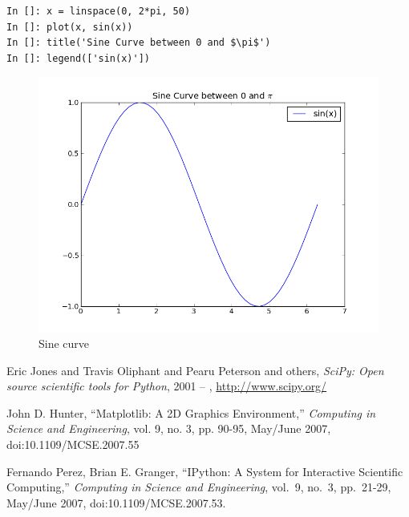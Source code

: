 \documentclass{article}
\begin{document}
\begin{lstlisting}
In []: x = linspace(0, 2*pi, 50)
In []: plot(x, sin(x))
In []: title('Sine Curve between 0 and $\pi$')
In []: legend(['sin(x)'])
\end{lstlisting}

\begin{figure}[h!]
  \begin{center}
    \includegraphics[scale=0.4]{sine}    
  \end{center}
  \caption{Sine curve}
  \label{fig:sin}
\end{figure}



\begin{thebibliography}{9}
    Eric Jones and Travis Oliphant and Pearu Peterson and others,
    \emph{SciPy: Open source scientific tools for Python}, 2001 -- , 
    \url{http://www.scipy.org/} 

   John D. Hunter, ``Matplotlib: A 2D Graphics Environment,''
   \emph{Computing in Science and Engineering}, vol. 9, no. 3,
   pp. 90-95, May/June 2007, doi:10.1109/MCSE.2007.55 

    Fernando Perez, Brian E. Granger, ``IPython: A System for
    Interactive Scientific Computing,'' \emph{Computing in Science and
    Engineering}, vol.~9, no.~3, pp.~21-29, May/June 2007,
    doi:10.1109/MCSE.2007.53. 

\end{thebibliography}
\end{document}
